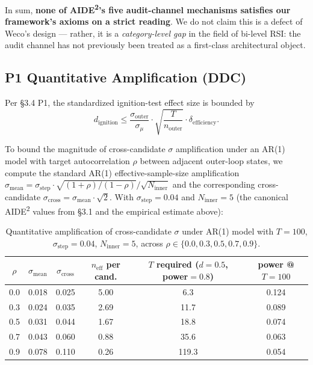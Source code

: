 In sum, \textbf{none of AIDE\textsuperscript{2}'s five audit-channel mechanisms satisfies our framework's axioms on a strict reading}. We do not claim this is a defect of Weco's design --- rather, it is a \emph{category-level gap} in the field of bi-level RSI: the audit channel has not previously been treated as a first-class architectural object.

\subsection{P1 Quantitative Amplification (DDC)}

Per \S3.4 P1, the standardized ignition-test effect size is bounded by
\[
d_{\text{ignition}} \le \frac{\sigma_{\text{outer}}}{\sigma_\mu} \cdot \sqrt{\frac{T}{n_{\text{outer}}}} \cdot \delta_{\text{efficiency}}.
\]

To bound the magnitude of cross-candidate $\sigma$ amplification under an AR(1) model with target autocorrelation $\rho$ between adjacent outer-loop states, we compute the standard AR(1) effective-sample-size amplification $\sigma_{\text{mean}} = \sigma_{\text{step}} \cdot \sqrt{(1+\rho)/(1-\rho)} / \sqrt{N_{\text{inner}}}$ and the corresponding cross-candidate $\sigma_{\text{cross}} = \sigma_{\text{mean}} \cdot \sqrt{2}$. With $\sigma_{\text{step}} = 0.04$ and $N_{\text{inner}} = 5$ (the canonical AIDE\textsuperscript{2} values from \S3.1 and the empirical estimate above):

\begin{table}[h]
\centering
\caption{Quantitative amplification of cross-candidate $\sigma$ under AR(1) model with $T = 100$, $\sigma_{\text{step}} = 0.04$, $N_{\text{inner}} = 5$, across $\rho \in \{0.0, 0.3, 0.5, 0.7, 0.9\}$.}
\label{tab:ddc-amplification}
\begin{tabular}{cccccc}
\toprule
$\rho$ & $\sigma_{\text{mean}}$ & $\sigma_{\text{cross}}$ & $n_{\text{eff}}$ per cand. & $T$ required ($d=0.5$, power$=0.8$) & power @ $T=100$ \\
\midrule
0.0 & 0.018 & 0.025 & 5.00 & 6.3 & 0.124 \\
0.3 & 0.024 & 0.035 & 2.69 & 11.7 & 0.089 \\
0.5 & 0.031 & 0.044 & 1.67 & 18.8 & 0.074 \\
0.7 & 0.043 & 0.060 & 0.88 & 35.6 & 0.063 \\
0.9 & 0.078 & 0.110 & 0.26 & 119.3 & 0.054 \\
\bottomrule
\end{tabular}
\end{table}

